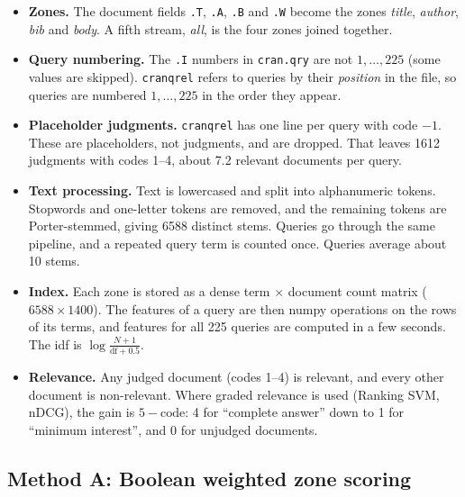 \documentclass[11pt,a4paper]{article}
\newcommand{\code}[1]{\texttt{#1}}
\begin{document}
\begin{itemize}
  \item \textbf{Zones.} The document fields \code{.T}, \code{.A}, \code{.B} and \code{.W}
  become the zones \emph{title}, \emph{author}, \emph{bib} and \emph{body}. A fifth stream,
  \emph{all}, is the four zones joined together.

  \item \textbf{Query numbering.} The \code{.I} numbers in \code{cran.qry} are not
  $1,\dots,225$ (some values are skipped). \code{cranqrel} refers to queries by their
  \emph{position} in the file, so queries are numbered $1,\dots,225$ in the order they
  appear.

  \item \textbf{Placeholder judgments.} \code{cranqrel} has one line per query with code
  $-1$. These are placeholders, not judgments, and are dropped. That leaves 1612 judgments
  with codes 1--4, about 7.2 relevant documents per query.

  \item \textbf{Text processing.} Text is lowercased and split into alphanumeric tokens.
  Stopwords and one-letter tokens are removed, and the remaining tokens are Porter-stemmed,
  giving 6588 distinct stems. Queries go through the same pipeline, and a repeated query term
  is counted once. Queries average about 10 stems.

  \item \textbf{Index.} Each zone is stored as a dense term $\times$ document count matrix
  ($6588 \times 1400$). The features of a query are then numpy operations on the rows of its
  terms, and features for all 225 queries are computed in a few seconds. The idf is
  $\log\frac{N+1}{\text{df}+0.5}$.

  \item \textbf{Relevance.} Any judged document (codes 1--4) is relevant, and every other
  document is non-relevant. Where graded relevance is used (Ranking SVM, nDCG), the gain is
  $5-\text{code}$: 4 for ``complete answer'' down to 1 for ``minimum interest'', and 0 for
  unjudged documents.
\end{itemize}

\subsection{Method A: Boolean weighted zone scoring}
\end{document}
